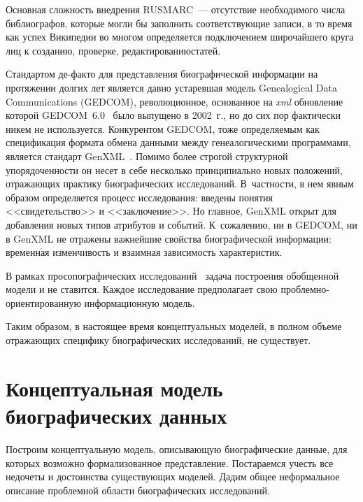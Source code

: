 \begin{multicols}{2}
  Основная сложность внедрения RUSMARC~--- отсутствие необходимого 
числа библиографов, которые могли бы заполнить соответствующие записи, в 
то время как успех Википедии во многом определя\-ет\-ся подключением 
широчайшего круга лиц к созданию, проверке, редактированию\linebreak статей. 
  
  Стандартом де-фак\-то для представления 
биографической информации на протяжении долгих лет является давно 
устаревшая модель Ge\-ne\-a\-logi\-cal 
Data Communications (\mbox{GEDCOM}), революционное, основанное на \textit{xml} 
обновление которой \mbox{GEDCOM}~6.0~\cite{9mar} было выпущено в 2002~г., но 
до сих пор фактически никем не используется. Конкурентом \mbox{GEDCOM}, тоже 
определяемым как спецификация формата обмена данными между 
генеалогическими программами, является стандарт GenXML~\cite{10mar}. 
Помимо более строгой структурной упорядоченности он несет в себе 
несколько принципиально новых положений, отражающих практику 
биографических исследований. В~частности, в нем явным образом 
определяется процесс исследования: введены понятия <<свидетельство>> и 
<<заключение>>. Но главное, GenXML открыт для добавления новых типов 
атрибутов и событий. К~сожалению, ни в GEDCOM, ни в GenXML не 
отражены важнейшие свойства биографической информации: временн$\acute{\mbox{а}}$я 
изменчивость и взаимная зависимость характеристик. 
  
  В рамках просопографических исследований~\cite{11mar} задача построения 
обобщенной модели и не ставится. Каждое исследование предполагает свою 
проблемно-ориентированную информационную модель. 
  
  Таким образом, в настоящее время концептуальных моделей, в полном 
объеме отражающих специфику биографических исследований, не существует.

\section{Концептуальная модель биографических данных} 
  
  Построим концептуальную модель, описы\-ва\-ющую биографические данные, 
для которых возмож\-но формализованное представление. Постараемся учесть 
все недочеты и достоинства существующих моделей. Дадим общее 
неформальное описание проблемной области биографических исследований.
  

\end{multicols}
